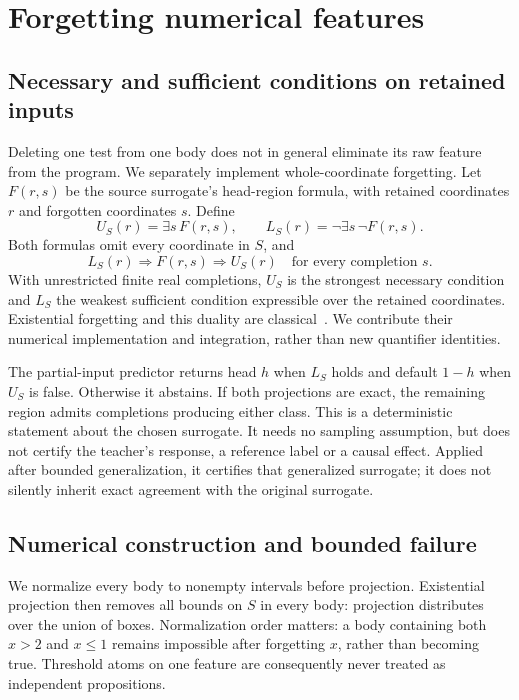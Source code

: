 \section{Forgetting numerical features}\label{sec:feature-forgetting}
\subsection{Necessary and sufficient conditions on retained inputs}
Deleting one test from one body does not in general eliminate its raw feature from the program. We separately implement whole-coordinate forgetting. Let $F(r,s)$ be the source surrogate's head-region formula, with retained coordinates $r$ and forgotten coordinates $s$. Define
\begin{equation}\label{eq:forgetting-envelope}
 U_S(r)=\exists s\,F(r,s),\qquad
 L_S(r)=\neg\exists s\,\neg F(r,s).
\end{equation}
Both formulas omit every coordinate in $S$, and
\begin{equation}\label{eq:forgetting-sandwich}
 L_S(r)\Rightarrow F(r,s)\Rightarrow U_S(r)
 \quad\text{for every completion }s.
\end{equation}
With unrestricted finite real completions, $U_S$ is the strongest necessary condition and $L_S$ the weakest sufficient condition expressible over the retained coordinates. Existential forgetting and this duality are classical~\citep{lin1994forget,lin2001conditions}. We contribute their numerical implementation and integration, rather than new quantifier identities.

The partial-input predictor returns head $h$ when $L_S$ holds and default $1-h$ when $U_S$ is false. Otherwise it abstains. If both projections are exact, the remaining region admits completions producing either class. This is a deterministic statement about the chosen surrogate. It needs no sampling assumption, but does not certify the teacher's response, a reference label or a causal effect. Applied after bounded generalization, it certifies that generalized surrogate; it does not silently inherit exact agreement with the original surrogate.

\subsection{Numerical construction and bounded failure}
We normalize every body to nonempty intervals before projection. Existential projection then removes all bounds on $S$ in every body: projection distributes over the union of boxes. Normalization order matters: a body containing both $x>2$ and $x\leq1$ remains impossible after forgetting $x$, rather than becoming true. Threshold atoms on one feature are consequently never treated as independent propositions.

